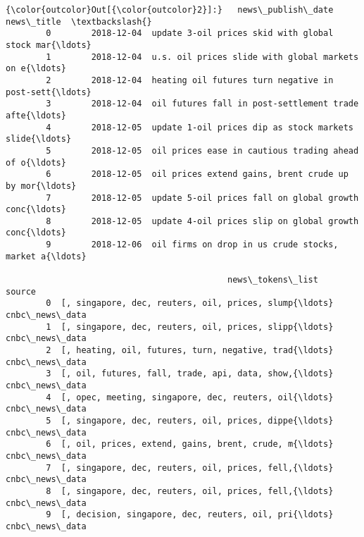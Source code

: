 \documentclass[11pt]{article}
\begin{document}
\begin{Verbatim}[commandchars=\\\{\}]
{\color{outcolor}Out[{\color{outcolor}2}]:}   news\_publish\_date                                         news\_title  \textbackslash{}
        0        2018-12-04  update 3-oil prices skid with global stock mar{\ldots}   
        1        2018-12-04  u.s. oil prices slide with global markets on e{\ldots}   
        2        2018-12-04  heating oil futures turn negative in post-sett{\ldots}   
        3        2018-12-04  oil futures fall in post-settlement trade afte{\ldots}   
        4        2018-12-05  update 1-oil prices dip as stock markets slide{\ldots}   
        5        2018-12-05  oil prices ease in cautious trading ahead of o{\ldots}   
        6        2018-12-05  oil prices extend gains, brent crude up by mor{\ldots}   
        7        2018-12-05  update 5-oil prices fall on global growth conc{\ldots}   
        8        2018-12-05  update 4-oil prices slip on global growth conc{\ldots}   
        9        2018-12-06  oil firms on drop in us crude stocks, market a{\ldots}   
        
                                            news\_tokens\_list          source  
        0  [, singapore, dec, reuters, oil, prices, slump{\ldots}  cnbc\_news\_data  
        1  [, singapore, dec, reuters, oil, prices, slipp{\ldots}  cnbc\_news\_data  
        2  [, heating, oil, futures, turn, negative, trad{\ldots}  cnbc\_news\_data  
        3  [, oil, futures, fall, trade, api, data, show,{\ldots}  cnbc\_news\_data  
        4  [, opec, meeting, singapore, dec, reuters, oil{\ldots}  cnbc\_news\_data  
        5  [, singapore, dec, reuters, oil, prices, dippe{\ldots}  cnbc\_news\_data  
        6  [, oil, prices, extend, gains, brent, crude, m{\ldots}  cnbc\_news\_data  
        7  [, singapore, dec, reuters, oil, prices, fell,{\ldots}  cnbc\_news\_data  
        8  [, singapore, dec, reuters, oil, prices, fell,{\ldots}  cnbc\_news\_data  
        9  [, decision, singapore, dec, reuters, oil, pri{\ldots}  cnbc\_news\_data  
\end{Verbatim}
            
\end{document}
